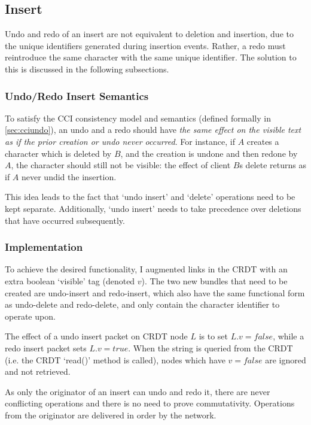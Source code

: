 \documentclass[12pt,a4paper,twoside,openright]{report}
\begin{document}
	
	\subsection{Insert}
	Undo and redo of an insert are not equivalent to deletion and insertion, due to the unique identifiers generated during insertion events. Rather, a redo must reintroduce the same character with the same unique identifier. The solution to this is discussed in the following subsections.
	
		\subsubsection{Undo/Redo Insert Semantics}
		To satisfy the CCI consistency model and semantics (defined formally in \cref{sec:cciundo}), an undo and a redo should have \textit{the same effect on the visible text as if the prior creation or undo never occurred}. For instance, if $A$ creates a character which is deleted by $B$, and the creation is undone and then redone by $A$, the character should still not be visible: the effect of client $B$s delete returns as if $A$ never undid the insertion.
		
		This idea leads to the fact that `undo insert' and `delete' operations need to be kept separate. Additionally, `undo insert' needs to take precedence over deletions that have occurred subsequently.
		
		\subsubsection{Implementation}
		
		To achieve the desired functionality, I augmented links in the CRDT with an extra boolean `visible' tag (denoted $v$). The two new bundles that need to be created are undo-insert and redo-insert, which also have the same functional form as undo-delete and redo-delete, and only contain the character identifier to operate upon.
		
		The effect of a undo insert packet on CRDT node $L$ is to set $L.v = false$, while a redo insert packet sets $L.v = true$. When the string is queried from the CRDT (i.e. the CRDT `read()' method is called), nodes which have $v = false$ are ignored and not retrieved.
		
		As only the originator of an insert can undo and redo it, there are never conflicting operations and there is no need to prove commutativity. Operations from the originator are delivered in order by the network.
		
\end{document}
